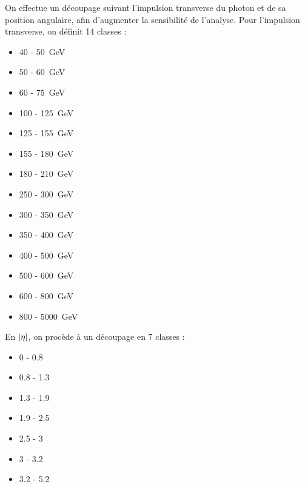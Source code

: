 On effectue un découpage suivant l'impulsion transverse du photon et de sa position angulaire, afin d'augmenter la sensibilité de l'analyse. Pour l'impulsion transverse, on définit 14 classes :

\setlength{\columnsep}{0pt}
\begin{multicols}{4}
  \begin{itemize} \setlength{\itemsep}{0.4\itemsep}
      \item 40 - \SI{50}{\GeV}
      \item 50 - \SI{60}{\GeV}
      \item 60 - \SI{75}{\GeV}
      \item 100 - \SI{125}{\GeV}
      \item 125 - \SI{155}{\GeV}
      \item 155 - \SI{180}{\GeV}
      \item 180 - \SI{210}{\GeV}
      \item 250 - \SI{300}{\GeV}
      \item 300 - \SI{350}{\GeV}
      \item 350 - \SI{400}{\GeV}
      \item 400 - \SI{500}{\GeV}
      \item 500 - \SI{600}{\GeV}
      \item 600 - \SI{800}{\GeV}
      \item 800 - \SI{5000}{\GeV}
  \end{itemize}
\end{multicols}


En $\lvert \eta \rvert$, on procède à un découpage en 7 classes :

\begin{multicols}{4}
  \begin{itemize} \setlength{\itemsep}{0.4\itemsep}
      \item \num{0} - \num{0.8}
      \item \num{0.8} - \num{1.3}
      \item \num{1.3} - \num{1.9}
      \item \num{1.9} - \num{2.5}
      \item \num{2.5} - \num{3}
      \item \num{3} - \num{3.2}
      \item \num{3.2} - \num{5.2}
  \end{itemize}
\end{multicols}

